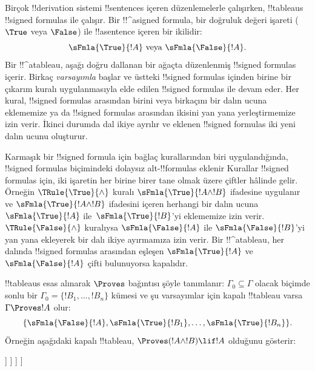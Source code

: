 \documentclass[../../../include/open-logic-section]{subfiles}
\begin{document}
      {}
      {}


Birçok !!{derivation} sistemi !!{sentence}s içeren düzenlemelerle çalışırken,
!!{tableau}s !!{signed formula}s ile çalışır. Bir !!^a{signed formula}, bir
doğruluk değeri işareti ($\True$ veya $\False$) ile !!a{sentence} içeren bir
ikilidir:
\[
\sFmla{\True}{!A} \text{ veya } \sFmla{\False}{!A}.
\]
Bir !!^a{tableau}, aşağı doğru dallanan bir ağaçta düzenlenmiş !!{signed formula}s
içerir. Birkaç \emph{varsayımla} başlar ve üstteki !!{signed formula}s
içinden birine bir çıkarım kuralı uygulanmasıyla elde edilen !!{signed
formula}s ile devam eder. Her kural, !!{signed formula}s arasından birini
veya birkaçını bir dalın ucuna eklememize ya da !!{signed formula}s arasından
ikisini yan yana yerleştirmemize izin verir. İkinci durumda dal ikiye ayrılır
ve eklenen !!{signed formula}s iki yeni dalın ucunu oluşturur.

Karmaşık bir !!{signed formula} için bağlaç kurallarından biri uygulandığında,
!!{signed formula}s biçimindeki dolaysız alt-!!{formula}s eklenir
Kurallar !!{signed formula}s
için, iki işaretin her birine birer tane olmak üzere çiftler hâlinde gelir. Örneğin
$\TRule{\True}{\land}$ kuralı $\sFmla{\True}{!A \land !B}$ ifadesine
uygulanır ve $\sFmla{\True}{!A \land !B}$ ifadesini içeren herhangi bir dalın ucuna
$\sFmla{\True}{!A}$ ile~$\sFmla{\True}{!B}$'yi eklememize izin
verir.
$\TRule{\False}{\land}$ kuralıysa $\sFmla{\False}{!A}$ ile
$\sFmla{\False}{!B}$'yi yan yana ekleyerek bir dalı ikiye ayırmamıza izin
verir. Bir !!^a{tableau}, her dalında !!{signed formula}s arasından eşleşen
$\sFmla{\True}{!A}$ ve $\sFmla{\False}{!A}$ çifti bulunuyorsa kapalıdır.

!!{tableau}s esas alınarak $\Proves$ bağıntısı şöyle tanımlanır:
$\Gamma_0 \subseteq \Gamma$ olacak biçimde sonlu bir
$\Gamma_0 = \{!B_1, \dots, !B_n\}$ kümesi ve şu varsayımlar için kapalı
!!{tableau} varsa $\Gamma
\Proves !A$ olur:
\[
\{\sFmla{\False}{!A}, \sFmla{\True}{!B_1}, \dots, \sFmla{\True}{!B_n}\}.
\]
Örneğin aşağıdaki kapalı !!{tableau}, $\Proves (!A \land !B) \lif !A$
olduğunu gösterir:
\begin{oltableau}
  [\sFmla{\False}{(\formula{A} \land \formula{B}) \lif \formula{A}}, just = \TAss
    [\sFmla{\True}{\formula{A} \land \formula{B}}, just = {\TRule{\False}{\lif}[1]}
      [\sFmla{\False}{\formula{A}}, just = {\TRule{\False}{\lif}[1]}
        [\sFmla{\True}{\formula{A}}, just = {\TRule{\True}{\land}[2]}
          [\sFmla{\True}{\formula{B}}, just = {\TRule{\True}{\land}[2]}, close]
        ]
      ]
    ]
  ]
\end{oltableau}
\end{document}
